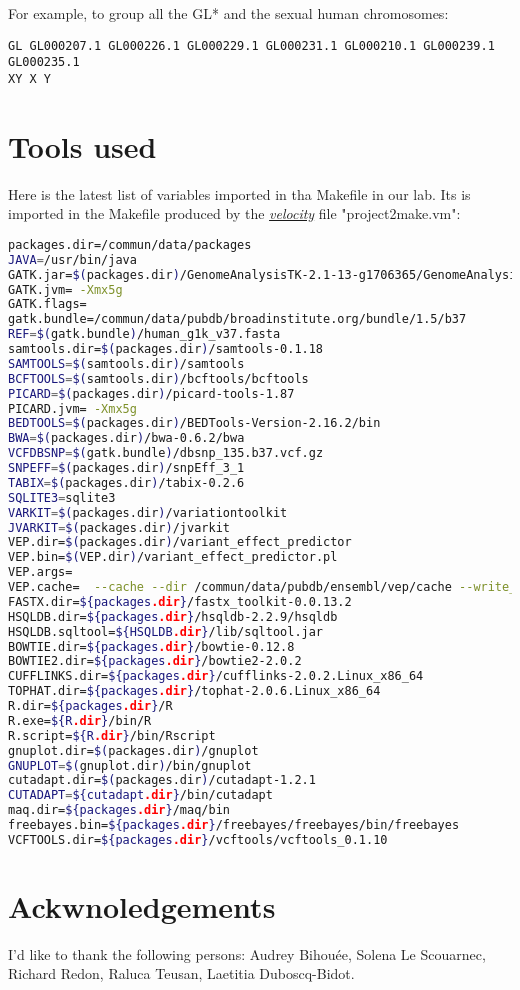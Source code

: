 \documentclass{article}
\newcommand{\velocity}{\href{http://velocity.apache.org/}{\em{velocity}}}
\begin{document}
For example, to group all the GL* and the sexual human chromosomes:
\begin{lstlisting}
GL GL000207.1 GL000226.1 GL000229.1 GL000231.1 GL000210.1 GL000239.1 GL000235.1 
XY X Y
\end{lstlisting} 

\section{Tools used}
Here is the latest list of variables imported in tha Makefile in our lab. Its is imported in the Makefile produced by the \velocity{} file "project2make.vm":
\begin{lstlisting}[language=bash]
packages.dir=/commun/data/packages
JAVA=/usr/bin/java
GATK.jar=$(packages.dir)/GenomeAnalysisTK-2.1-13-g1706365/GenomeAnalysisTK.jar
GATK.jvm= -Xmx5g
GATK.flags=
gatk.bundle=/commun/data/pubdb/broadinstitute.org/bundle/1.5/b37
REF=$(gatk.bundle)/human_g1k_v37.fasta
samtools.dir=$(packages.dir)/samtools-0.1.18
SAMTOOLS=$(samtools.dir)/samtools 
BCFTOOLS=$(samtools.dir)/bcftools/bcftools
PICARD=$(packages.dir)/picard-tools-1.87
PICARD.jvm= -Xmx5g 
BEDTOOLS=$(packages.dir)/BEDTools-Version-2.16.2/bin
BWA=$(packages.dir)/bwa-0.6.2/bwa
VCFDBSNP=$(gatk.bundle)/dbsnp_135.b37.vcf.gz
SNPEFF=$(packages.dir)/snpEff_3_1
TABIX=$(packages.dir)/tabix-0.2.6
SQLITE3=sqlite3
VARKIT=$(packages.dir)/variationtoolkit
JVARKIT=$(packages.dir)/jvarkit
VEP.dir=$(packages.dir)/variant_effect_predictor
VEP.bin=$(VEP.dir)/variant_effect_predictor.pl
VEP.args=
VEP.cache=  --cache --dir /commun/data/pubdb/ensembl/vep/cache --write_cache
FASTX.dir=${packages.dir}/fastx_toolkit-0.0.13.2
HSQLDB.dir=${packages.dir}/hsqldb-2.2.9/hsqldb
HSQLDB.sqltool=${HSQLDB.dir}/lib/sqltool.jar
BOWTIE.dir=${packages.dir}/bowtie-0.12.8
BOWTIE2.dir=${packages.dir}/bowtie2-2.0.2
CUFFLINKS.dir=${packages.dir}/cufflinks-2.0.2.Linux_x86_64
TOPHAT.dir=${packages.dir}/tophat-2.0.6.Linux_x86_64
R.dir=${packages.dir}/R
R.exe=${R.dir}/bin/R
R.script=${R.dir}/bin/Rscript
gnuplot.dir=$(packages.dir)/gnuplot            
GNUPLOT=$(gnuplot.dir)/bin/gnuplot
cutadapt.dir=$(packages.dir)/cutadapt-1.2.1
CUTADAPT=${cutadapt.dir}/bin/cutadapt
maq.dir=${packages.dir}/maq/bin
freebayes.bin=${packages.dir}/freebayes/freebayes/bin/freebayes
VCFTOOLS.dir=${packages.dir}/vcftools/vcftools_0.1.10
\end{lstlisting}

\section{Ackwnoledgements}
I'd like to thank the following persons:  Audrey Bihouée, Solena Le Scouarnec, Richard Redon, Raluca Teusan, Laetitia Duboscq-Bidot.
\end{document}
